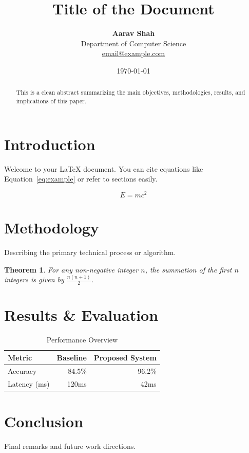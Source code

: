 \documentclass[11pt,a4paper]{article}
\title{\textbf{Title of the Document}}
\author{\textbf{Aarav Shah} \\ \small Department of Computer Science \\ \small \href{mailto:email@example.com}{email@example.com}}
\date{\today}
\newtheorem{theorem}{Theorem}[section]
\begin{document}
\maketitle

\begin{abstract}
This is a clean abstract summarizing the main objectives, methodologies, results, and implications of this paper.
\end{abstract}

\section{Introduction}
Welcome to your LaTeX document. You can cite equations like Equation~\ref{eq:example} or refer to sections easily.

\begin{equation}
\label{eq:example}
E = mc^2
\end{equation}

\section{Methodology}
Describing the primary technical process or algorithm.

\begin{theorem}
For any non-negative integer $n$, the summation of the first $n$ integers is given by $\frac{n(n+1)}{2}$.
\end{theorem}

\section{Results \& Evaluation}
\begin{table}[h]
\centering
\caption{Performance Overview}
\label{tab:results}
\begin{tabular}{@{}lrr@{}}
\toprule
\textbf{Metric} & \textbf{Baseline} & \textbf{Proposed System} \\
\midrule
Accuracy        & 84.5\%            & 96.2\%                   \\
Latency (ms)    & 120ms             & 42ms                     \\
\bottomrule
\end{tabular}
\end{table}

\section{Conclusion}
Final remarks and future work directions.
\end{document}
